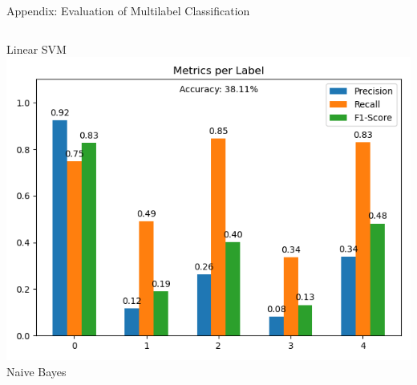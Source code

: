 \begin{frame}{Appendix: Evaluation of Multilabel Classification}
\begin{columns}[t,onlytextwidth]
        Linear SVM
        \centering
        \includegraphics[width=\textwidth]{figures/evaluation_nb_multilabel.png}\\
        Naive Bayes
    \end{columns}
\end{frame}

